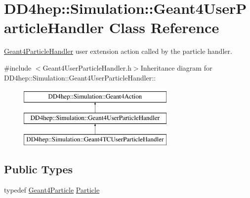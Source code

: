 \hypertarget{class_d_d4hep_1_1_simulation_1_1_geant4_user_particle_handler}{
\section{DD4hep::Simulation::Geant4UserParticleHandler Class Reference}
\label{class_d_d4hep_1_1_simulation_1_1_geant4_user_particle_handler}
}


\hyperlink{class_d_d4hep_1_1_simulation_1_1_geant4_particle_handler}{Geant4ParticleHandler} user extension action called by the particle handler.  


{\ttfamily \#include $<$Geant4UserParticleHandler.h$>$}Inheritance diagram for DD4hep::Simulation::Geant4UserParticleHandler::\begin{figure}[H]
\begin{center}
\leavevmode
\includegraphics[height=3cm]{class_d_d4hep_1_1_simulation_1_1_geant4_user_particle_handler}
\end{center}
\end{figure}
\subsection*{Public Types}
\begin{DoxyCompactItemize}
\item 
typedef \hyperlink{class_d_d4hep_1_1_simulation_1_1_geant4_particle}{Geant4Particle} \hyperlink{class_d_d4hep_1_1_simulation_1_1_geant4_user_particle_handler_a0222f326d539ff27c6c446a7a30e8e26}{Particle}
\end{DoxyCompactItemize}
